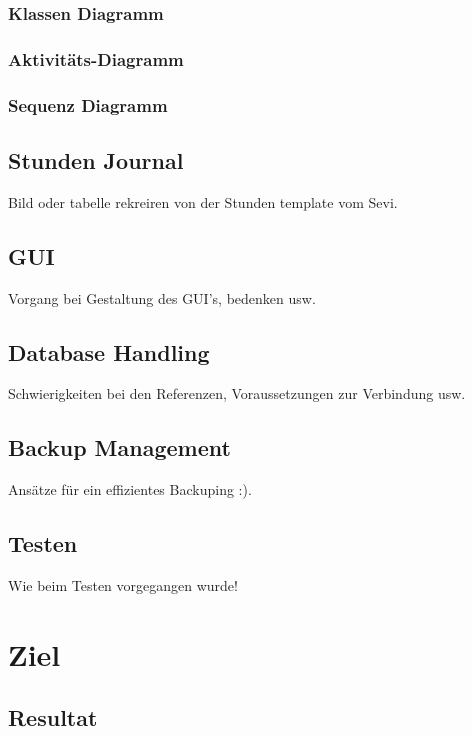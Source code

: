 \documentclass{article}
\begin{document}
\subsubsection{Klassen Diagramm}

\subsubsection{Aktivitäts-Diagramm}

\subsubsection{Sequenz Diagramm}

\subsection{Stunden Journal}
Bild oder tabelle rekreiren von der Stunden template vom Sevi.

\subsection{GUI}
Vorgang bei Gestaltung des GUI's, bedenken usw.

\subsection{Database Handling}
Schwierigkeiten bei den Referenzen, Voraussetzungen zur Verbindung usw.

\subsection{Backup Management}
Ansätze für ein effizientes Backuping :).

\subsection{Testen}
Wie beim Testen vorgegangen wurde!

\newpage

\section{Ziel}
\subsection{Resultat}
\end{document}
